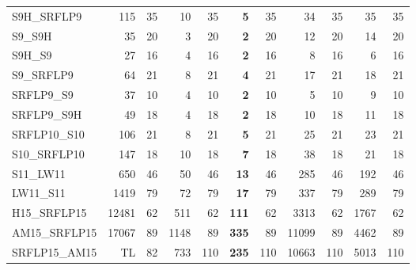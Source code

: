 \documentclass{article}
\begin{document}
\begin{longtable}{lrrrrrrrrrr}
\bottomrule
\endlastfoot
S9H\_SRFLP9 & 115 & 35 & 10 & 35 & \textbf{5} & 35 & 34 & 35 & 35 & 35 \\
S9\_S9H & 35 & 20 & 3 & 20 & \textbf{2} & 20 & 12 & 20 & 14 & 20 \\
S9H\_S9 & 27 & 16 & 4 & 16 & \textbf{2} & 16 & 8 & 16 & 6 & 16 \\
S9\_SRFLP9 & 64 & 21 & 8 & 21 & \textbf{4} & 21 & 17 & 21 & 18 & 21 \\
SRFLP9\_S9 & 37 & 10 & 4 & 10 & \textbf{2} & 10 & 5 & 10 & 9 & 10 \\
SRFLP9\_S9H & 49 & 18 & 4 & 18 & \textbf{2} & 18 & 10 & 18 & 11 & 18 \\
SRFLP10\_S10 & 106 & 21 & 8 & 21 & \textbf{5} & 21 & 25 & 21 & 23 & 21 \\
S10\_SRFLP10 & 147 & 18 & 10 & 18 & \textbf{7} & 18 & 38 & 18 & 21 & 18 \\
S11\_LW11 & 650 & 46 & 50 & 46 & \textbf{13} & 46 & 285 & 46 & 192 & 46 \\
LW11\_S11 & 1419 & 79 & 72 & 79 & \textbf{17} & 79 & 337 & 79 & 289 & 79 \\
H15\_SRFLP15 & 12481 & 62 & 511 & 62 & \textbf{111} & 62 & 3313 & 62 & 1767 & 62 \\
AM15\_SRFLP15 & 17067 & 89 & 1148 & 89 & \textbf{335} & 89 & 11099 & 89 & 4462 & 89 \\
SRFLP15\_AM15 & TL & 82 & 733 & 110 & \textbf{235} & 110 & 10663 & 110 & 5013 & 110 
\end{longtable}
\endgroup{}
\end{document}
